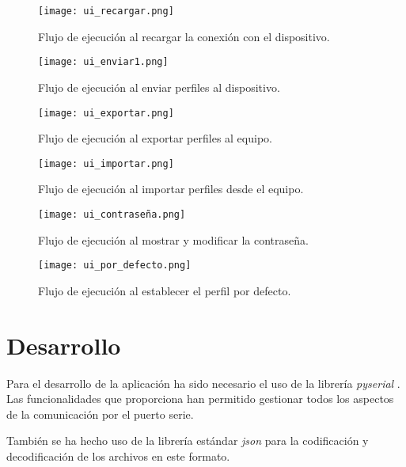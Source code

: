 \begin{figure}[h!]
    \centering
    \texttt{[image: ui\_recargar.png]}
    \caption{Flujo de ejecución al recargar la conexión con el dispositivo.}
    \label{fig:ui_recargar}
\end{figure}

\begin{figure}[h!]
    \centering
    \texttt{[image: ui\_enviar1.png]}
    \caption{Flujo de ejecución al enviar perfiles al dispositivo.}
    \label{fig:ui_enviar1}
\end{figure}

\begin{figure}[h!]
    \centering
    \texttt{[image: ui\_exportar.png]}
    \caption{Flujo de ejecución al exportar perfiles al equipo.}
    \label{fig:ui_exportar}
\end{figure}

\begin{figure}[h!]
    \centering
    \texttt{[image: ui\_importar.png]}
    \caption{Flujo de ejecución al importar perfiles desde el equipo.}
    \label{fig:ui_importar}
\end{figure}

\begin{figure}[h!]
    \centering
    \texttt{[image: ui\_contraseña.png]}
    \caption{Flujo de ejecución al mostrar y modificar la contraseña.}
    \label{fig:ui_contraseña}
\end{figure}

\begin{figure}[h!]
    \centering
    \texttt{[image: ui\_por\_defecto.png]}
    \caption{Flujo de ejecución al establecer el perfil por defecto.}
    \label{fig:ui_por_defecto}
\end{figure}

\section{Desarrollo}

Para el desarrollo de la aplicación ha sido necesario el uso de la librería \textit{pyserial} \cite{pyserial-lib}. Las funcionalidades que proporciona han permitido gestionar todos los aspectos de la comunicación por el puerto serie.

También se ha hecho uso de la librería estándar \textit{json} \cite{json-lib} para la codificación y decodificación de los archivos en este formato.

